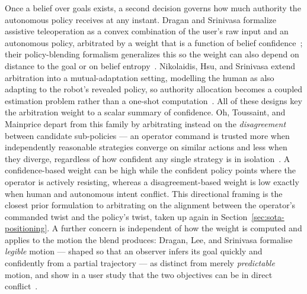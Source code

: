 \documentclass[12pt,a4paper,twoside,openright]{report}
\begin{document}
Once a belief over goals exists, a second decision governs how much authority the autonomous policy receives at any instant. Dragan and Srinivasa formalize assistive teleoperation as a convex combination of the user's raw input and an autonomous policy, arbitrated by a weight that is a function of belief confidence~\cite{dragan2012formalizing}; their policy-blending formalism generalizes this so the weight can also depend on distance to the goal or on belief entropy~\cite{dragan2013policy}. Nikolaidis, Hsu, and Srinivasa extend arbitration into a mutual-adaptation setting, modelling the human as also adapting to the robot's revealed policy, so authority allocation becomes a coupled estimation problem rather than a one-shot computation~\cite{nikolaidis2017mutualadaptation}. All of these designs key the arbitration weight to a scalar summary of confidence. Oh, Toussaint, and Mainprice depart from this family by arbitrating instead on the \emph{disagreement} between candidate sub-policies --- an operator command is trusted more when independently reasonable strategies converge on similar actions and less when they diverge, regardless of how confident any single strategy is in isolation~\cite{oh2021disagreement}. A confidence-based weight can be high while the confident policy points where the operator is actively resisting, whereas a disagreement-based weight is low exactly when human and autonomous intent conflict. This directional framing is the closest prior formulation to arbitrating on the alignment between the operator's commanded twist and the policy's twist, taken up again in Section~\ref{sec:sota-positioning}. A further concern is independent of how the weight is computed and applies to the motion the blend produces: Dragan, Lee, and Srinivasa formalise \emph{legible} motion --- shaped so that an observer infers its goal quickly and confidently from a partial trajectory --- as distinct from merely \emph{predictable} motion, and show in a user study that the two objectives can be in direct conflict~\cite{dragan2013legibility}.
\end{document}
